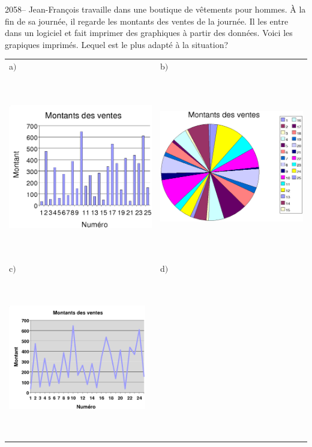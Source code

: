 \documentclass[letterpaper, 12pt]{article}
\begin{document}
2058-- Jean-Fran\c cois travaille dans une boutique de v\^etements pour hommes. \`A la fin de sa journ\'ee, il regarde les montants des ventes de la journ\'ee. Il les entre dans un logiciel et fait imprimer des graphiques \`a partir des donn\'ees. Voici les grapiques imprim\'es. Lequel est le plus adapt\'e \`a la situation?\\

\begin{tabular}{l l}
a$)$ & b$)$ \\
 \includegraphics[width=7cm,height=8cm]{Q2058.eps}
&
 \includegraphics[width=7cm,height=8cm]{Q2058b.eps}
\\
c$)$ & d$)$ \\
 \includegraphics[width=6cm,height=7cm]{Q2058c.eps}

\end{tabular}
\end{document}
